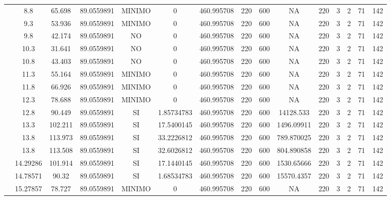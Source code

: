 \begin{table}[H]
{\begin{tabular}{|c|c|c|c|c|c|c|c|c|c|c|c|c|c|c|}
\cline{2-15}    & 8.8 & 65.698 & 89.0559891 & MINIMO & 0   & 460.995708 & 220 & 600 & NA  & 220 & 3   & 2   & 71  & 142 \bigstrut\\
\cline{2-15}    & 9.3 & 53.936 & 89.0559891 & MINIMO & 0   & 460.995708 & 220 & 600 & NA  & 220 & 3   & 2   & 71  & 142 \bigstrut\\
\cline{2-15}    & 9.8 & 42.174 & 89.0559891 & NO  & 0   & 460.995708 & 220 & 600 & NA  & 220 & 3   & 2   & 71  & 142 \bigstrut\\
\cline{2-15}    & 10.3 & 31.641 & 89.0559891 & NO  & 0   & 460.995708 & 220 & 600 & NA  & 220 & 3   & 2   & 71  & 142 \bigstrut\\
\cline{2-15}    & 10.8 & 43.403 & 89.0559891 & NO  & 0   & 460.995708 & 220 & 600 & NA  & 220 & 3   & 2   & 71  & 142 \bigstrut\\
\cline{2-15}    & 11.3 & 55.164 & 89.0559891 & MINIMO & 0   & 460.995708 & 220 & 600 & NA  & 220 & 3   & 2   & 71  & 142 \bigstrut\\
\cline{2-15}    & 11.8 & 66.926 & 89.0559891 & MINIMO & 0   & 460.995708 & 220 & 600 & NA  & 220 & 3   & 2   & 71  & 142 \bigstrut\\
\cline{2-15}    & 12.3 & 78.688 & 89.0559891 & MINIMO & 0   & 460.995708 & 220 & 600 & NA  & 220 & 3   & 2   & 71  & 142 \bigstrut\\
\cline{2-15}    & 12.8 & 90.449 & 89.0559891 & SI  & 1.85734783 & 460.995708 & 220 & 600 & 14128.533 & 220 & 3   & 2   & 71  & 142 \bigstrut\\
\cline{2-15}    & 13.3 & 102.211 & 89.0559891 & SI  & 17.5400145 & 460.995708 & 220 & 600 & 1496.09911 & 220 & 3   & 2   & 71  & 142 \bigstrut\\
\cline{2-15}    & 13.8 & 113.973 & 89.0559891 & SI  & 33.2226812 & 460.995708 & 220 & 600 & 789.870025 & 220 & 3   & 2   & 71  & 142 \bigstrut\\
\cline{2-15}    & 13.8 & 113.508 & 89.0559891 & SI  & 32.6026812 & 460.995708 & 220 & 600 & 804.890858 & 220 & 3   & 2   & 71  & 142 \bigstrut\\
\cline{2-15}    & 14.29286 & 101.914 & 89.0559891 & SI  & 17.1440145 & 460.995708 & 220 & 600 & 1530.65666 & 220 & 3   & 2   & 71  & 142 \bigstrut\\
\cline{2-15}    & 14.78571 & 90.32 & 89.0559891 & SI  & 1.68534783 & 460.995708 & 220 & 600 & 15570.4357 & 220 & 3   & 2   & 71  & 142 \bigstrut\\
\cline{2-15}    & 15.27857 & 78.727 & 89.0559891 & MINIMO & 0   & 460.995708 & 220 & 600 & NA  & 220 & 3   & 2   & 71  & 142 \bigstrut\\

\end{tabular}}
\end{table}
